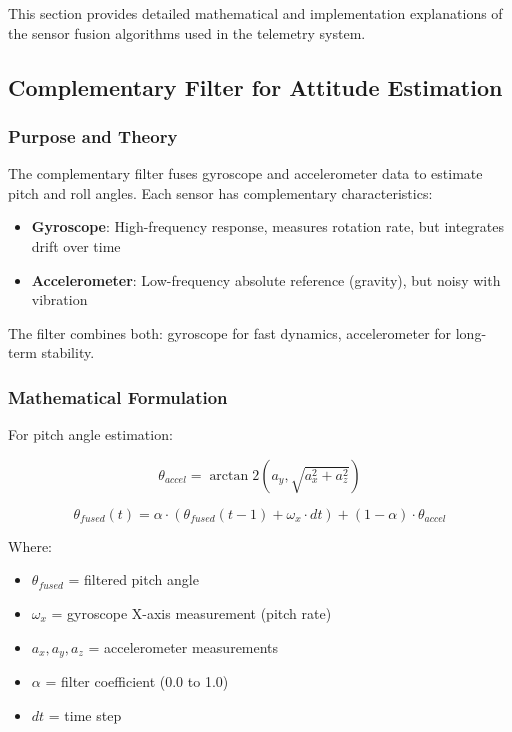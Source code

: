\documentclass[11pt,a4paper]{article}
\begin{document}
This section provides detailed mathematical and implementation explanations of the sensor fusion algorithms used in the telemetry system.

\subsection{Complementary Filter for Attitude Estimation}

\subsubsection{Purpose and Theory}

The complementary filter fuses gyroscope and accelerometer data to estimate pitch and roll angles. Each sensor has complementary characteristics:

\begin{itemize}
    \item \textbf{Gyroscope}: High-frequency response, measures rotation rate, but integrates drift over time
    \item \textbf{Accelerometer}: Low-frequency absolute reference (gravity), but noisy with vibration
\end{itemize}

The filter combines both: gyroscope for fast dynamics, accelerometer for long-term stability.

\subsubsection{Mathematical Formulation}

For pitch angle estimation:

\begin{equation}
\theta_{accel} = \arctan2(a_y, \sqrt{a_x^2 + a_z^2})
\end{equation}

\begin{equation}
\theta_{fused}(t) = \alpha \cdot (\theta_{fused}(t-1) + \omega_x \cdot dt) + (1-\alpha) \cdot \theta_{accel}
\end{equation}

Where:
\begin{itemize}
    \item $\theta_{fused}$ = filtered pitch angle
    \item $\omega_x$ = gyroscope X-axis measurement (pitch rate)
    \item $a_x, a_y, a_z$ = accelerometer measurements
    \item $\alpha$ = filter coefficient (0.0 to 1.0)
    \item $dt$ = time step
\end{itemize}
\end{document}
